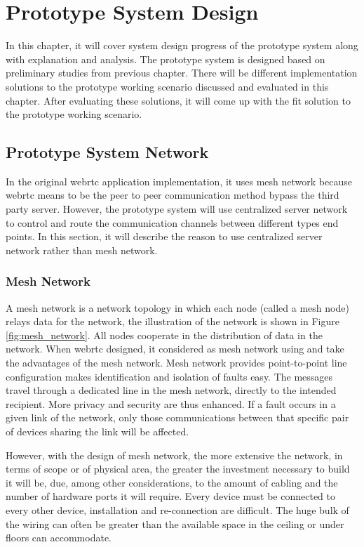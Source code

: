 \chapter{Prototype System Design}
\label{chp:sys_design}

\noindent In this chapter, it will cover system design progress of the prototype system along with explanation and analysis. The prototype system is designed based on preliminary studies from previous chapter. There will be different implementation solutions to the prototype working scenario  discussed and evaluated in this chapter. After evaluating these solutions, it will come up with the fit solution to the prototype working scenario. 

\section{Prototype System Network}

\noindent In the original \gls{webrtc} application implementation, it uses mesh network because \gls{webrtc} means to be the peer to peer communication method bypass the third party server. However, the prototype system will use centralized server network to control and route the communication channels between different types end points. In this section, it will describe the reason to use centralized server network rather than mesh network.

\subsection{Mesh Network}

\par A mesh network is a network topology in which each node (called a mesh node) relays data for the network, the illustration of the network is shown in Figure \ref{fig:mesh_network}. All nodes cooperate in the distribution of data in the network. When \gls{webrtc} designed, it considered as mesh network using and take the advantages of the mesh network. Mesh network provides point-to-point line configuration makes identification and isolation of faults easy. The messages travel through a dedicated line in the mesh network, directly to the intended recipient. More privacy and security are thus enhanced. If a fault occurs in a given link of the network, only those communications between that specific pair of devices sharing the link will be affected.\cite{wiki:mesh_network}

\par However, with the design of mesh network, the more extensive the network, in terms of scope or of physical area, the greater the investment necessary to build it will be, due, among other considerations, to the amount of cabling and the number of hardware ports it will require.
Every device must be connected to every other device, installation and re-connection are difficult. The huge bulk of the wiring can often be greater than the available space in the ceiling or under floors can accommodate.

